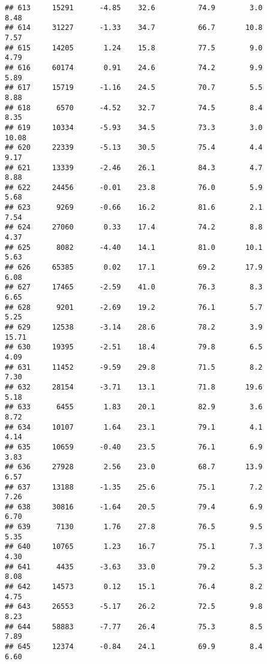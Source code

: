 \documentclass[
]{article}
\begin{document}
\begin{verbatim}
## 613     15291      -4.85    32.6          74.9        3.0              8.48
## 614     31227      -1.33    34.7          66.7       10.8              7.57
## 615     14205       1.24    15.8          77.5        9.0              4.79
## 616     60174       0.91    24.6          74.2        9.9              5.89
## 617     15719      -1.16    24.5          70.7        5.5              8.88
## 618      6570      -4.52    32.7          74.5        8.4              8.35
## 619     10334      -5.93    34.5          73.3        3.0             10.08
## 620     22339      -5.13    30.5          75.4        4.4              9.17
## 621     13339      -2.46    26.1          84.3        4.7              8.88
## 622     24456      -0.01    23.8          76.0        5.9              5.68
## 623      9269      -0.66    16.2          81.6        2.1              7.54
## 624     27060       0.33    17.4          74.2        8.8              4.37
## 625      8082      -4.40    14.1          81.0       10.1              5.63
## 626     65385       0.02    17.1          69.2       17.9              6.08
## 627     17465      -2.59    41.0          76.3        8.3              6.65
## 628      9201      -2.69    19.2          76.1        5.7              5.25
## 629     12538      -3.14    28.6          78.2        3.9             15.71
## 630     19395      -2.51    18.4          79.8        6.5              4.09
## 631     11452      -9.59    29.8          71.5        8.2              7.30
## 632     28154      -3.71    13.1          71.8       19.6              5.18
## 633      6455       1.83    20.1          82.9        3.6              8.72
## 634     10107       1.64    23.1          79.1        4.1              4.14
## 635     10659      -0.40    23.5          76.1        6.9              3.83
## 636     27928       2.56    23.0          68.7       13.9              6.57
## 637     13188      -1.35    25.6          75.1        7.2              7.26
## 638     30816      -1.64    20.5          79.4        6.9              6.70
## 639      7130       1.76    27.8          76.5        9.5              5.35
## 640     10765       1.23    16.7          75.1        7.3              4.30
## 641      4435      -3.63    33.0          79.2        5.3              8.08
## 642     14573       0.12    15.1          76.4        8.2              4.75
## 643     26553      -5.17    26.2          72.5        9.8              8.23
## 644     58883      -7.77    26.4          75.3        8.5              7.89
## 645     12374      -0.84    24.1          69.9        8.4              6.60

\end{verbatim}
\end{document}
